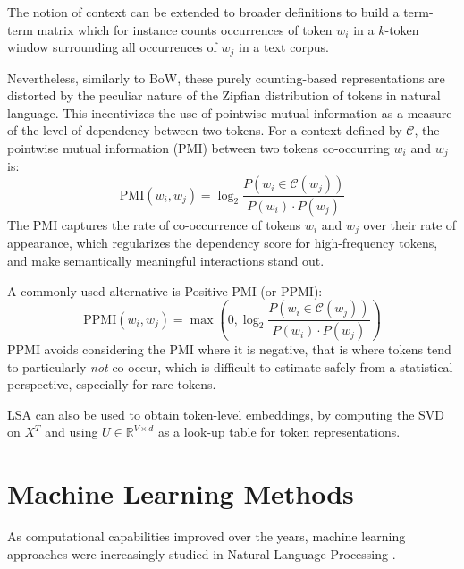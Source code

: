 The notion of context can be extended to broader definitions to build a term-term matrix which for instance counts occurrences of token $w_i$ in a $k$-token window surrounding all occurrences of $w_j$ in a text corpus. 

Nevertheless, similarly to BoW, these purely counting-based representations are distorted by the peculiar nature of the Zipfian distribution of tokens in natural language. This incentivizes the use of pointwise mutual information \citep{shannon_mi} as a measure of the level of dependency between two tokens. For a context defined by $\mathcal{C}$, the pointwise mutual information (PMI) between two tokens co-occurring $w_i$ and $w_j$ is:
$$
\text{PMI}(w_i, w_j) = \log_2 \frac{P(w_i \in \mathcal{C}(w_j))}{P(w_i) \cdot P(w_j)}
$$
The PMI captures the rate of co-occurrence of tokens $w_i$ and $w_j$ over their rate of appearance, which regularizes the dependency score for high-frequency tokens, and make semantically meaningful interactions stand out.

A commonly used alternative is Positive PMI (or PPMI):
$$
\text{PPMI}(w_i, w_j) = \max (0, \log_2 \frac{P(w_i \in \mathcal{C}(w_j))}{P(w_i) \cdot P(w_j)})
$$
PPMI avoids considering the PMI where it is negative, that is where tokens tend to particularly \textit{not} co-occur, which is difficult to estimate safely from a statistical perspective, especially for rare tokens.

LSA can also be used to obtain token-level embeddings, by computing the SVD on $X^T$ and using $U \in \mathbb{R}^{V \times d}$ as a look-up table for token representations.


\section{Machine Learning Methods}

As computational capabilities improved over the years, machine learning approaches were increasingly studied in Natural Language Processing \citep{billingsley-curran-2012-improvements,cho-etal-2014-learning}.

